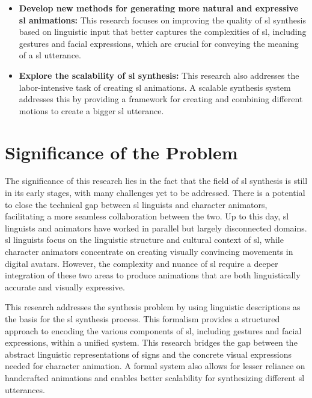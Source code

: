 \documentclass[../../main.tex]
{subfiles}
\begin{document}
\begin{itemize}
    \item \textbf{Develop new methods for generating more natural and expressive \gls{sl} animations:} This research focuses on improving the quality of \gls{sl} synthesis based on linguistic input that better captures the complexities of \gls{sl}, including gestures and facial expressions, which are crucial for conveying the meaning of a \gls{sl} utterance.
    \item \textbf{Explore the scalability of \gls{sl} synthesis:} This research also addresses the labor-intensive task of creating \gls{sl} animations. A scalable synthesis system addresses this by providing a framework for creating and combining different motions to create a bigger \gls{sl} utterance.
\end{itemize}

\section{Significance of the Problem}
\label{ch:introduction:significance}

The significance of this research lies in the fact that the field of \gls{sl} synthesis is still in its early stages, with many challenges yet to be addressed. There is a potential to close the technical gap between \gls{sl} linguists and character animators, facilitating a more seamless collaboration between the two. Up to this day, \gls{sl} linguists and animators have worked in parallel but largely disconnected domains. \gls{sl} linguists focus on the linguistic structure and cultural context of \gls{sl}, while character animators concentrate on creating visually convincing movements in digital avatars. However, the complexity and nuance of \gls{sl} require a deeper integration of these two areas to produce animations that are both linguistically accurate and visually expressive.

This research addresses the synthesis problem by using linguistic descriptions as the basis for the \gls{sl} synthesis process. This formalism provides a structured approach to encoding the various components of \gls{sl}, including gestures and facial expressions, within a unified system. This research bridges the gap between the abstract linguistic representations of signs and the concrete visual expressions needed for character animation. A formal system also allows for lesser reliance on handcrafted animations and enables better scalability for synthesizing different \gls{sl} utterances.
\end{document}
